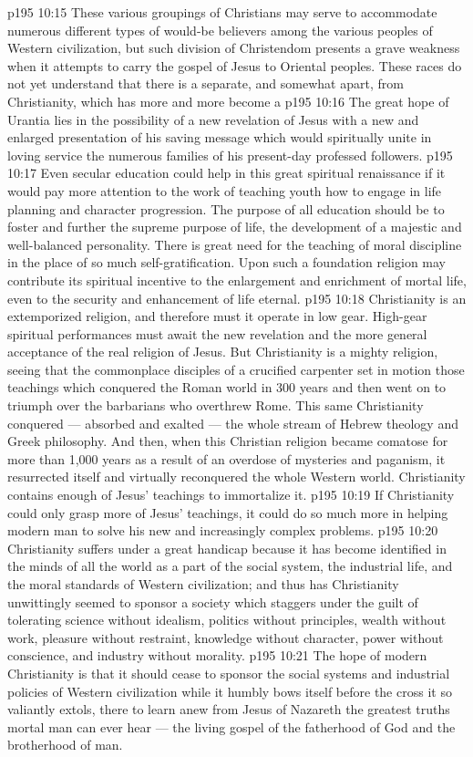 \vs p195 10:15 These various groupings of Christians may serve to accommodate numerous different types of would\hyp{}be believers among the various peoples of Western civilization, but such division of Christendom presents a grave weakness when it attempts to carry the gospel of Jesus to Oriental peoples. These races do not yet understand that there is a  separate, and somewhat apart, from Christianity, which has more and more become a 
\vs p195 10:16 The great hope of Urantia lies in the possibility of a new revelation of Jesus with a new and enlarged presentation of his saving message which would spiritually unite in loving service the numerous families of his present\hyp{}day professed followers.
\vs p195 10:17 Even secular education could help in this great spiritual renaissance if it would pay more attention to the work of teaching youth how to engage in life planning and character progression. The purpose of all education should be to foster and further the supreme purpose of life, the development of a majestic and well\hyp{}balanced personality. There is great need for the teaching of moral discipline in the place of so much self\hyp{}gratification. Upon such a foundation religion may contribute its spiritual incentive to the enlargement and enrichment of mortal life, even to the security and enhancement of life eternal.
\vs p195 10:18 Christianity is an extemporized religion, and therefore must it operate in low gear. High\hyp{}gear spiritual performances must await the new revelation and the more general acceptance of the real religion of Jesus. But Christianity is a mighty religion, seeing that the commonplace disciples of a crucified carpenter set in motion those teachings which conquered the Roman world in 300 years and then went on to triumph over the barbarians who overthrew Rome. This same Christianity conquered --- absorbed and exalted --- the whole stream of Hebrew theology and Greek philosophy. And then, when this Christian religion became comatose for more than 1,000 years as a result of an overdose of mysteries and paganism, it resurrected itself and virtually reconquered the whole Western world. Christianity contains enough of Jesus’ teachings to immortalize it.
\vs p195 10:19 If Christianity could only grasp more of Jesus’ teachings, it could do so much more in helping modern man to solve his new and increasingly complex problems.
\vs p195 10:20 Christianity suffers under a great handicap because it has become identified in the minds of all the world as a part of the social system, the industrial life, and the moral standards of Western civilization; and thus has Christianity unwittingly seemed to sponsor a society which staggers under the guilt of tolerating science without idealism, politics without principles, wealth without work, pleasure without restraint, knowledge without character, power without conscience, and industry without morality.
\vs p195 10:21 The hope of modern Christianity is that it should cease to sponsor the social systems and industrial policies of Western civilization while it humbly bows itself before the cross it so valiantly extols, there to learn anew from Jesus of Nazareth the greatest truths mortal man can ever hear --- the living gospel of the fatherhood of God and the brotherhood of man.
\quizlink

